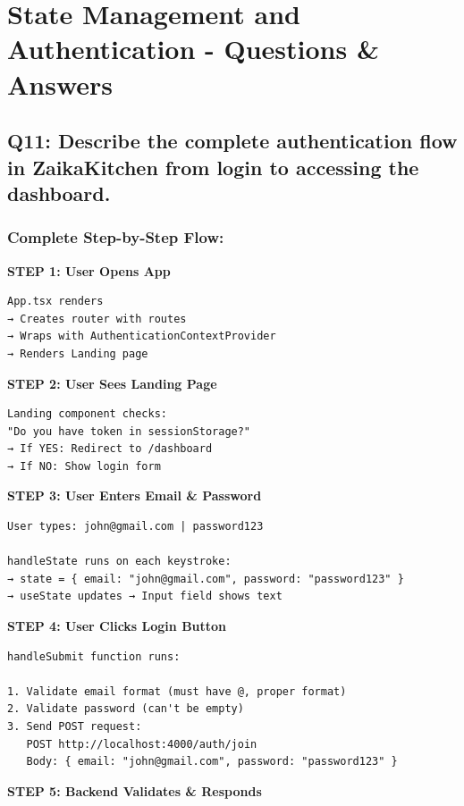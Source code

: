 \documentclass[12pt]{article}
\begin{document}
\section{State Management and Authentication - Questions \& Answers}

\subsection{Q11: Describe the complete authentication flow in ZaikaKitchen from login to accessing the dashboard.}

\subsubsection*{Complete Step-by-Step Flow:}

\textbf{STEP 1: User Opens App}

\begin{lstlisting}
App.tsx renders
→ Creates router with routes
→ Wraps with AuthenticationContextProvider
→ Renders Landing page
\end{lstlisting}

\textbf{STEP 2: User Sees Landing Page}

\begin{lstlisting}
Landing component checks:
"Do you have token in sessionStorage?"
→ If YES: Redirect to /dashboard
→ If NO: Show login form
\end{lstlisting}

\textbf{STEP 3: User Enters Email \& Password}

\begin{lstlisting}
User types: john@gmail.com | password123

handleState runs on each keystroke:
→ state = { email: "john@gmail.com", password: "password123" }
→ useState updates → Input field shows text
\end{lstlisting}

\textbf{STEP 4: User Clicks Login Button}

\begin{lstlisting}
handleSubmit function runs:

1. Validate email format (must have @, proper format)
2. Validate password (can't be empty)
3. Send POST request:
   POST http://localhost:4000/auth/join
   Body: { email: "john@gmail.com", password: "password123" }
\end{lstlisting}

\textbf{STEP 5: Backend Validates \& Responds}
\end{document}
